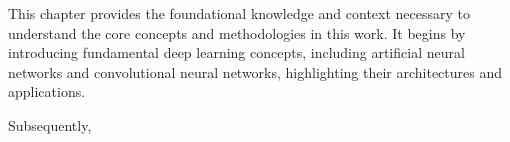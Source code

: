 
This chapter provides the foundational knowledge and context necessary to understand the core concepts and methodologies in this work.
It begins by introducing fundamental deep learning concepts, including artificial neural networks and convolutional neural networks, highlighting their architectures and applications.  

Subsequently, 

